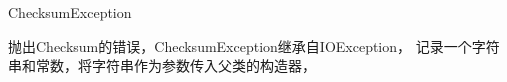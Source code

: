 \begin{XeClass}{ChecksumException}
   
 抛出Checksum的错误，ChecksumException继承自IOException，
 记录一个字符串和常数，将字符串作为参数传入父类的构造器，

\end{XeClass}
